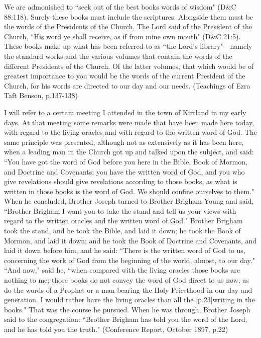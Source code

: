 \begin{displayquote}
We are admonished to ``seek out of the best books words of wisdom" (D\&C 88:118). 
Surely these books must include the scriptures. Alongside them must be the words of 
the Presidents of the Church. The Lord said of the President of the Church, ``His 
word ye shall receive, as if from mine own mouth" (D\&C 21:5). These books make up 
what has been referred to as ``the Lord’s library"—namely the standard works and 
the various volumes that contain the words of the different Presidents of the Church. 
Of the latter volumes, that which would be of greatest importance to you would be 
the words of the current President of the Church, for his words are directed to our 
day and our needs. (Teachings of Ezra Taft Benson, p.137-138)
\end{displayquote}

\begin{displayquote}
I will refer to a certain meeting I attended in the town of Kirtland in my early 
days. At that meeting some remarks were made that have been made here today, with 
regard to the living oracles and with regard to the written word of God. The same 
principle was presented, although not as extensively as it has been here, when a 
leading man in the Church got up and talked upon the subject, and said: 
``You have got the word of God before you here in the Bible, Book of Mormon, and 
Doctrine and Covenants; you have the written word of God, and you who give 
revelations should give revelations according to those books, as what is written in 
those books is the word of God. We should confine ourselves to them." When he 
concluded, Brother Joseph turned to Brother Brigham Young and said, ``Brother 
Brigham I want you to take the stand and tell us your views with regard to the 
written oracles and the written word of God." Brother Brigham took the stand, and 
he took the Bible, and laid it down; he took the Book of Mormon, and laid it down; 
and he took the Book of Doctrine and Covenants, and laid it down before him, and he 
said: ``There is the written word of God to us, concerning the work of God from the 
beginning of the world, almost, to our day." ``And now," said he, ``when compared 
with the living oracles those books are nothing to me; those books do not convey 
the word of God direct to us now, as do the words of a Prophet or a man bearing the 
Holy Priesthood in our day and generation. I would rather have the living oracles 
than all the [p.23]writing in the books." That was the course he pursued. When he was 
through, Brother Joseph said to the congregation: ``Brother Brigham has told you the
word of the Lord, and he has told you the truth."  (Conference Report, 
  October 1897, p.22)
\end{displayquote}

